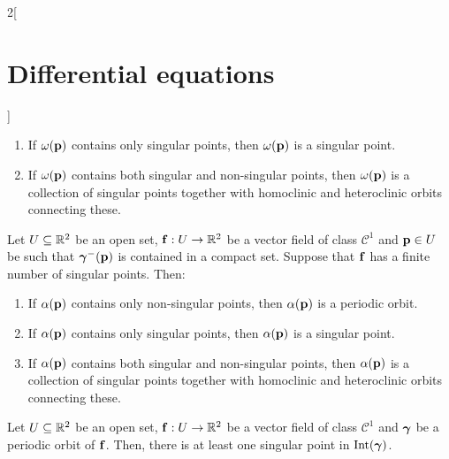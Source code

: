 \documentclass[../../../main.tex]{subfiles}
\begin{document}
\begin{multicols}{2}[\section{Differential equations}]
\begin{theorem}
\begin{enumerate}
      \item If $\omega(\boldsymbol{\mathrm{p}})$ contains only singular points, then $\omega(\boldsymbol{\mathrm{p}})$ is a singular point.
      \item If $\omega(\boldsymbol{\mathrm{p}})$ contains both singular and non-singular points, then $\omega(\boldsymbol{\mathrm{p}})$ is a collection of singular points together with homoclinic and heteroclinic orbits connecting these.
    \end{enumerate}
  \end{theorem}
  \begin{corollary}
    Let $U\subseteq \mathbb{R}^2$ be an open set, $\boldsymbol{\mathrm{f}}:U\rightarrow\mathbb{R}^2$ be a vector field of class $\mathcal{C}^1$ and $\boldsymbol{\mathrm{p}}\in U$ be such that ${\boldsymbol{\mathrm{\gamma}}}^-(\boldsymbol{\mathrm{p}})$ is contained in a compact set. Suppose that $\boldsymbol{\mathrm{f}}$ has a finite number of singular points. Then:
    \begin{enumerate}
      \item If $\alpha(\boldsymbol{\mathrm{p}})$ contains only non-singular points, then $\alpha(\boldsymbol{\mathrm{p}})$ is a periodic orbit.
      \item If $\alpha(\boldsymbol{\mathrm{p}})$ contains only singular points, then $\alpha(\boldsymbol{\mathrm{p}})$ is a singular point.
      \item If $\alpha(\boldsymbol{\mathrm{p}})$ contains both singular and non-singular points, then $\alpha(\boldsymbol{\mathrm{p}})$ is a collection of singular points together with homoclinic and heteroclinic orbits connecting these.
    \end{enumerate}
  \end{corollary}
  \begin{corollary}
    Let $U\subseteq \mathbb{R}^2$ be an open set, $\boldsymbol{\mathrm{f}}:U\rightarrow\mathbb{R}^2$ be a vector field of class $\mathcal{C}^1$ and ${\boldsymbol{\mathrm{\gamma}}}$ be a periodic orbit of $\boldsymbol{\mathrm{f}}$. Then, there is at least one singular point in $\operatorname{Int}(\boldsymbol{\mathrm{\gamma}})$.
  \end{corollary}

\end{multicols}
\end{document}
